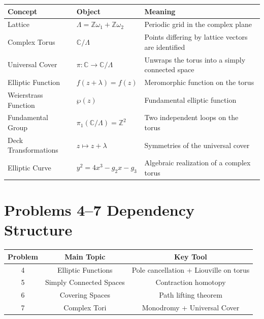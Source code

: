\documentclass[12pt,a4paper]{article}
\theoremstyle{notespace}
\begin{document}
\begin{center}
	\renewcommand{\arraystretch}{1.4}
	\begin{tabular}{|p{3cm}|p{4cm}|p{6cm}|}
		\hline
		Concept & Object & Meaning \\
		\hline
		
		Lattice &
		\(
		\Lambda=\mathbb Z\omega_1+\mathbb Z\omega_2
		\)
		&
		Periodic grid in the complex plane
		\\
		\hline
		
		Complex Torus &
		\(
		\mathbb C/\Lambda
		\)
		&
		Points differing by lattice vectors are identified
		\\
		\hline
		
		Universal Cover &
		\(
		\pi:\mathbb C\to\mathbb C/\Lambda
		\)
		&
		Unwraps the torus into a simply connected space
		\\
		\hline
		
		Elliptic Function &
		\(
		f(z+\lambda)=f(z)
		\)
		&
		Meromorphic function on the torus
		\\
		\hline
		
		Weierstrass Function &
		\(
		\wp(z)
		\)
		&
		Fundamental elliptic function
		\\
		\hline
		
		Fundamental Group &
		\(
		\pi_1(\mathbb C/\Lambda)
		=
		\mathbb Z^2
		\)
		&
		Two independent loops on the torus
		\\
		\hline
		
		Deck Transformations &
		\(
		z\mapsto z+\lambda
		\)
		&
		Symmetries of the universal cover
		\\
		\hline
		
		Elliptic Curve &
		\(
		y^2=4x^3-g_2x-g_3
		\)
		&
		Algebraic realization of a complex torus
		\\
		\hline
		
	\end{tabular}
\end{center}

\section{Problems 4--7 Dependency Structure}

\begin{center}
	\renewcommand{\arraystretch}{1.4}
	\begin{tabular}{|c|c|c|}
		\hline
		Problem &
		Main Topic &
		Key Tool
		\\
		\hline
		
		4 &
		Elliptic Functions &
		Pole cancellation + Liouville on torus
		\\
		\hline
		
		5 &
		Simply Connected Spaces &
		Contraction homotopy
		\\
		\hline
		
		6 &
		Covering Spaces &
		Path lifting theorem
		\\
		\hline
		
		7 &
		Complex Tori &
		Monodromy + Universal Cover
		\\
		\hline
		
	\end{tabular}
\end{center}
\end{document}
